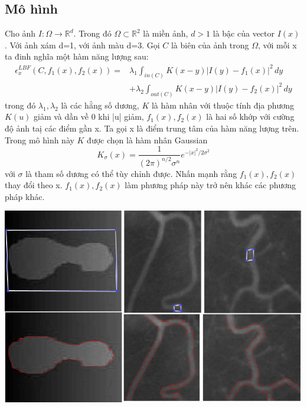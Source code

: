 \documentclass[14pt,oneside,a4paper]{extreport}
\begin{document}
\subsection{Mô hình}
\hspace{0.5cm}Cho ảnh $I: \Omega \rightarrow \mathbb{R}^d$. Trong đó $\Omega \subset \mathbb{R}^2$  là miền ảnh, $d>1$ là bậc của vector $I(x)$. Với ảnh xám d=1, với ảnh màu d=3. Gọi $C$ là biên của ảnh trong $\Omega$, với mỗi x ta đinh nghĩa một hàm năng lượng sau:
\begin{equation}
\begin{split}
\epsilon_x^{LBF}(C, f_1(x), f_2(x))=&\lambda_1 \int_{in(C)} K(x-y)|I(y)-f_1(x)|^2\,dy\\
									&+ \lambda_2 \int_{out(C)} K(x-y)|I(y)-f_2(x)|^2\,dy 
\end{split}
\end{equation}
trong đó $\lambda_1, \lambda_2$ là các hằng số dương, $K$ là hàm nhân với thuộc tính địa phương $K(u)$ giảm và dần về 0 khi |u| giảm, $f_1(x), f_2(x)$ là hai số khớp với cường độ ảnh taị các điểm gần x. Ta gọi x là điểm trung tâm của hàm năng lượng trên. Trong mô hình này $K$ được chọn là hàm nhân Gaussian
\begin{equation*}
K_{\sigma}(x)=\dfrac{1}{(2\pi)^{n/2}\sigma^n}e^{-|x|^2/2\sigma^2}
\end{equation*}
với $\sigma$ là tham số dương có thể tùy chỉnh được. Nhấn mạnh rằng $f_1(x), f_2(x)$ thay đổi theo x. $f_1(x), f_2(x)$ làm phương pháp này trở nên khác các phương pháp khác.
\begin{center}
\includegraphics[scale=0.7]{figure/LBFresult.png}
\end{center}
\end{document}
